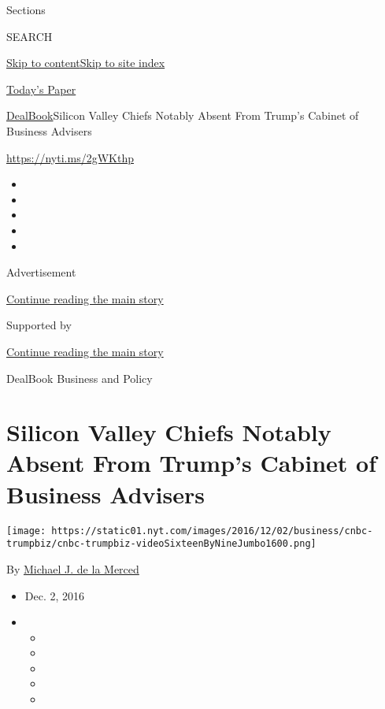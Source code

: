 Sections

SEARCH

\protect\hyperlink{site-content}{Skip to
content}\protect\hyperlink{site-index}{Skip to site index}

\href{https://myaccount.nytimes.com/auth/login?response_type=cookie\&client_id=vi}{}

\href{https://www.nytimes.com/section/todayspaper}{Today's Paper}

\href{/section/business/dealbook}{DealBook}\textbar{}Silicon Valley
Chiefs Notably Absent From Trump's Cabinet of Business Advisers

\url{https://nyti.ms/2gWKthp}

\begin{itemize}
\item
\item
\item
\item
\item
\end{itemize}

Advertisement

\protect\hyperlink{after-top}{Continue reading the main story}

Supported by

\protect\hyperlink{after-sponsor}{Continue reading the main story}

DealBook Business and Policy

\hypertarget{silicon-valley-chiefs-notably-absent-from-trumps-cabinet-of-business-advisers}{%
\section{Silicon Valley Chiefs Notably Absent From Trump's Cabinet of
Business
Advisers}\label{silicon-valley-chiefs-notably-absent-from-trumps-cabinet-of-business-advisers}}

\texttt{[image: https://static01.nyt.com/images/2016/12/02/business/cnbc-trumpbiz/cnbc-trumpbiz-videoSixteenByNineJumbo1600.png]}

By \href{http://www.nytimes.com/by/michael-j-de-la-merced}{Michael J. de
la Merced}

\begin{itemize}
\item
  Dec. 2, 2016
\item
  \begin{itemize}
  \item
  \item
  \item
  \item
  \item
  \end{itemize}
\end{itemize}

